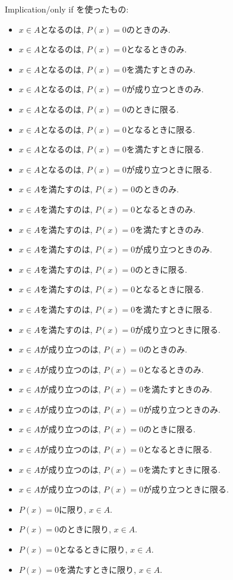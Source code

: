 \documentclass[a4paper,12pt,draft]{amsart}
\begin{document}
Implication/only if を使ったもの:
\begin{itemize}
\item $x\in A$となるのは, $P(x)=0$のときのみ.
\item $x\in A$となるのは, $P(x)=0$となるときのみ.
\item $x\in A$となるのは, $P(x)=0$を満たすときのみ.
\item $x\in A$となるのは, $P(x)=0$が成り立つときのみ.
\item $x\in A$となるのは, $P(x)=0$のときに限る.
\item $x\in A$となるのは, $P(x)=0$となるときに限る.
\item $x\in A$となるのは, $P(x)=0$を満たすときに限る.
\item $x\in A$となるのは, $P(x)=0$が成り立つときに限る.
\item $x\in A$を満たすのは, $P(x)=0$のときのみ.
\item $x\in A$を満たすのは, $P(x)=0$となるときのみ.
\item $x\in A$を満たすのは, $P(x)=0$を満たすときのみ.
\item $x\in A$を満たすのは, $P(x)=0$が成り立つときのみ.
\item $x\in A$を満たすのは, $P(x)=0$のときに限る.
\item $x\in A$を満たすのは, $P(x)=0$となるときに限る.
\item $x\in A$を満たすのは, $P(x)=0$を満たすときに限る.
\item $x\in A$を満たすのは, $P(x)=0$が成り立つときに限る.
\item $x\in A$が成り立つのは, $P(x)=0$のときのみ.
\item $x\in A$が成り立つのは, $P(x)=0$となるときのみ.
\item $x\in A$が成り立つのは, $P(x)=0$を満たすときのみ.
\item $x\in A$が成り立つのは, $P(x)=0$が成り立つときのみ.
\item $x\in A$が成り立つのは, $P(x)=0$のときに限る.
\item $x\in A$が成り立つのは, $P(x)=0$となるときに限る.
\item $x\in A$が成り立つのは, $P(x)=0$を満たすときに限る.
\item $x\in A$が成り立つのは, $P(x)=0$が成り立つときに限る.
\item $P(x)=0$に限り, $x\in A$.
\item $P(x)=0$のときに限り, $x\in A$.
\item $P(x)=0$となるときに限り, $x\in A$.
\item $P(x)=0$を満たすときに限り, $x\in A$.

\end{itemize}
\end{document}
